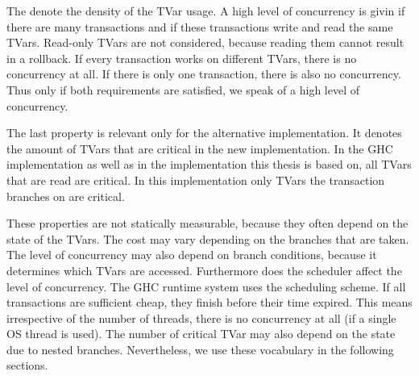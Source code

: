 The  denote the density of the TVar usage. A high level of 
concurrency is givin if there are many transactions and if these transactions write and read the same
TVars. Read-only TVars are not considered, because reading them cannot result in a rollback.
If every transaction works on different TVars, there is no concurrency at all. If there 
is only one transaction, there is also no concurrency. Thus only if both requirements are satisfied,
we speak of a high level of concurrency. 

The last property is relevant only for the alternative implementation. It denotes the amount of TVars that 
are critical in the new implementation. In the GHC implementation as well as in the implementation
this thesis is based on, all TVars that are read are critical. In this implementation only TVars the 
transaction branches on are critical. 

These properties are not statically measurable, because they often depend on the state of the TVars. 
The cost may vary depending on the branches that are taken. The level of concurrency may also 
depend on branch conditions, because it determines which TVars are accessed. Furthermore does 
the scheduler affect the level of concurrency. The GHC runtime system uses the 
scheduling scheme. If all transactions are sufficient cheap, they finish before their time expired.
This means irrespective of the number of threads, there is no concurrency at all (if a single OS thread
is used). The number of critical TVar may also depend on the state due to nested branches.
Nevertheless, we use these vocabulary in the following sections.

